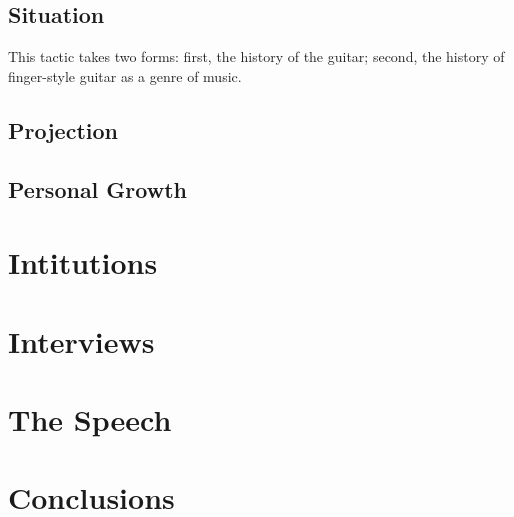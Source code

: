 \documentclass[12pt]{article}
\begin{document}
\subsection{Situation}
\label{sec:situation}
This tactic takes two forms: first, the history of the guitar; second,
the history of finger-style guitar as a genre of music. 
\subsection{Projection}
\label{sec:projection}

\subsection{Personal Growth}
\label{sec:personal-growth}

\section{Intitutions}
\label{sec:intitutions}

\section{Interviews}
\label{sec:interviews}

\section{The Speech}
\label{sec:speech}

\section{Conclusions}
\label{sec:conclusions}
\end{document}
